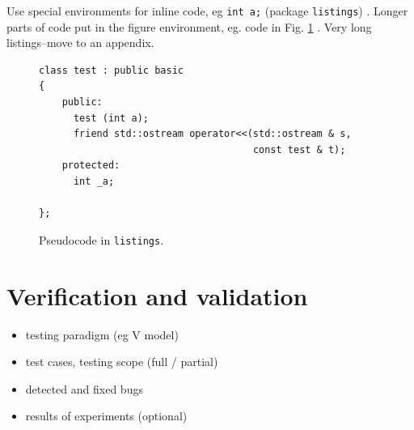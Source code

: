 \documentclass[a4paper,twoside,12pt]{book}
\begin{document}


Use special environments for inline code, eg  \lstinline|int a;| (package \texttt{listings})%
. Longer parts of code put in the figure environment, eg. code in Fig. \ref{fig:pseudocode:listings}%
. Very long listings–move to an appendix.


\clearpage
\begin{figure}
\centering
\begin{lstlisting}
class test : public basic
{
    public:
      test (int a);
      friend std::ostream operator<<(std::ostream & s, 
                                     const test & t);
    protected:
      int _a;  
      
};
\end{lstlisting}
\caption{Pseudocode in \texttt{listings}.}
\label{fig:pseudocode:listings}
\end{figure}

%      


 
\chapter{Verification and validation}
\begin{itemize}
\item testing paradigm (eg V model)
\item test cases, testing scope (full / partial)
\item detected and fixed bugs
\item results of experiments (optional)
\end{itemize}
\end{document}
